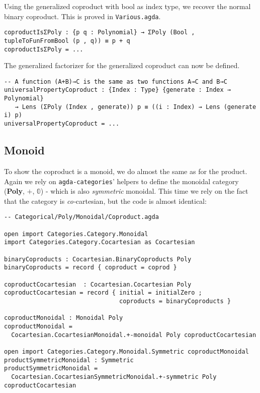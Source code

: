 Using the generalized coproduct with bool as index type, we recover the normal binary coproduct. This is proved in \texttt{Various.agda}.

\begin{verbatim}
coproductIsΣPoly : {p q : Polynomial} → ΣPoly (Bool , tupleToFunFromBool (p , q)) ≡ p + q
coproductIsΣPoly = ...
\end{verbatim}

The generalized factorizer for the generalized coproduct can now be defined.

\begin{verbatim}
-- A function (A+B)→C is the same as two functions A→C and B→C
universalPropertyCoproduct : {Index : Type} {generate : Index → Polynomial}
   → Lens (ΣPoly (Index , generate)) p ≡ ((i : Index) → Lens (generate i) p)
universalPropertyCoproduct = ...
\end{verbatim}

\subsection{Monoid}
To show the coproduct is a monoid, we do almost the same as for the product. Again we rely on \texttt{agda-categories}' helpers to define the monoidal category (\textbf{Poly}, $+$, $\mathbb{0}$) - which is also \textit{symmetric} monoidal. This time we rely on the fact that the category is \textit{co-}cartesian, but the code is almost identical:
\begin{verbatim}
-- Categorical/Poly/Monoidal/Coproduct.agda

open import Categories.Category.Monoidal
import Categories.Category.Cocartesian as Cocartesian

binaryCoproducts : Cocartesian.BinaryCoproducts Poly
binaryCoproducts = record { coproduct = coprod }

coproductCocartesian  : Cocartesian.Cocartesian Poly
coproductCocartesian = record { initial = initialZero ;
                                coproducts = binaryCoproducts }

coproductMonoidal : Monoidal Poly
coproductMonoidal = 
  Cocartesian.CocartesianMonoidal.+-monoidal Poly coproductCocartesian

open import Categories.Category.Monoidal.Symmetric coproductMonoidal
productSymmetricMonoidal : Symmetric
productSymmetricMonoidal = 
  Cocartesian.CocartesianSymmetricMonoidal.+-symmetric Poly coproductCocartesian
\end{verbatim}

